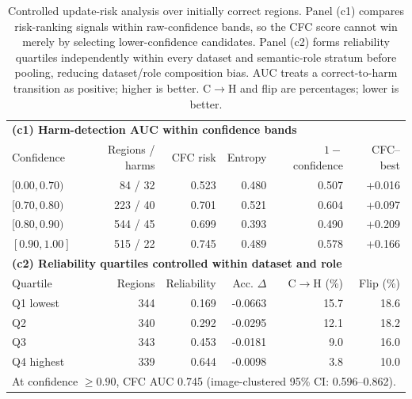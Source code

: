 \begin{table}[t]
\centering
\small
\caption{Controlled update-risk analysis over initially correct regions. Panel (c1) compares risk-ranking signals within raw-confidence bands, so the CFC score cannot win merely by selecting lower-confidence candidates. Panel (c2) forms reliability quartiles independently within every dataset and semantic-role stratum before pooling, reducing dataset/role composition bias. AUC treats a correct-to-harm transition as positive; higher is better. C$\rightarrow$H and flip are percentages; lower is better.}
\label{tab:source-risk-expanded}
\begin{tabular}{lrrrrr}
\toprule
\multicolumn{6}{l}{\textbf{(c1) Harm-detection AUC within confidence bands}}\\
Confidence & Regions / harms & CFC risk & Entropy & $1-$confidence & CFC--best \\
\midrule
$[0.00,0.70)$ & 84 / 32 & 0.523 & 0.480 & 0.507 & +0.016 \\
$[0.70,0.80)$ & 223 / 40 & 0.701 & 0.521 & 0.604 & +0.097 \\
$[0.80,0.90)$ & 544 / 45 & 0.699 & 0.393 & 0.490 & +0.209 \\
$[0.90,1.00]$ & 515 / 22 & 0.745 & 0.489 & 0.578 & +0.166 \\
\midrule
\multicolumn{6}{l}{\textbf{(c2) Reliability quartiles controlled within dataset and role}}\\
Quartile & Regions & Reliability & Acc. $\Delta$ & C$\rightarrow$H (\%) & Flip (\%) \\
\midrule
Q1 lowest & 344 & 0.169 & -0.0663 & 15.7 & 18.6 \\
Q2 & 340 & 0.292 & -0.0295 & 12.1 & 18.2 \\
Q3 & 343 & 0.453 & -0.0181 & 9.0 & 16.0 \\
Q4 highest & 339 & 0.644 & -0.0098 & 3.8 & 10.0 \\
\midrule
\multicolumn{6}{l}{\footnotesize At confidence $\geq0.90$, CFC AUC 0.745 (image-clustered 95\% CI: 0.596--0.862).}\\
\bottomrule
\end{tabular}
\end{table}
